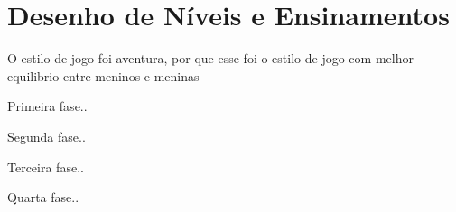 



\section{Desenho de Níveis e Ensinamentos}\label{sec:DN}


O estilo de jogo foi aventura, por que esse foi o estilo de jogo com melhor equilibrio entre meninos e meninas %

Primeira fase..

Segunda fase..

Terceira fase..

Quarta fase..


